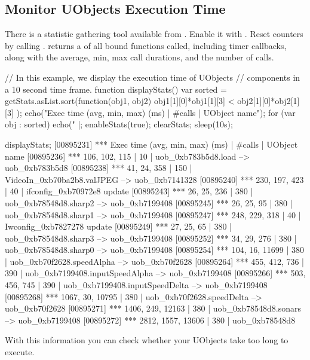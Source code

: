 \subsection{Monitor UObjects Execution Time}

There is a statistic gathering tool available from \us. Enable it with
. Reset counters by calling
.  returns a
 of all bound \Cxx functions called, including timer
callbacks, along with the average, min, max call durations, and the number
of calls.

\begin{urbiunchecked}
// In this example, we display the execution time of UObjects
// components in a 10 second time frame.
function displayStats()
{
  var sorted = getStats.asList.sort(function(obj1, obj2) {
    obj1[1][0]*obj1[1][3] < obj2[1][0]*obj2[1][3]
  });
  echo("Exec time (avg, min, max) (ms) | #calls | UObject name");
  for (var obj : sorted)
    echo("%
}|;
enableStats(true);
clearStats;
sleep(10s);

displayStats;
[00895231] *** Exec time (avg, min, max) (ms) | #calls | UObject name
[00895236] ***  106,  102,   115 |  10 | uob_0xb783b5d8.load --> uob_0xb783b5d8
[00895238] ***   41,   24,   358 | 150 | VideoIn_0xb70ba2b8.valJPEG --> uob_0xb7141328
[00895240] ***  230,  197,   423 |  40 | ifconfig_0xb70972e8 update
[00895243] ***   26,   25,   236 | 380 | uob_0xb78548d8.sharp2 --> uob_0xb7199408
[00895245] ***   26,   25,    95 | 380 | uob_0xb78548d8.sharp1 --> uob_0xb7199408
[00895247] ***  248,  229,   318 |  40 | Iwconfig_0xb7827278 update
[00895249] ***   27,   25,    65 | 380 | uob_0xb78548d8.sharp3 --> uob_0xb7199408
[00895252] ***   34,   29,   276 | 380 | uob_0xb78548d8.sharp0 --> uob_0xb7199408
[00895254] ***  104,   16, 11699 | 380 | uob_0xb70f2628.speedAlpha --> uob_0xb70f2628
[00895264] ***  455,  412,   736 | 390 | uob_0xb7199408.inputSpeedAlpha --> uob_0xb7199408
[00895266] ***  503,  456,   745 | 390 | uob_0xb7199408.inputSpeedDelta --> uob_0xb7199408
[00895268] *** 1067,   30, 10795 | 380 | uob_0xb70f2628.speedDelta --> uob_0xb70f2628
[00895271] *** 1406,  249, 12163 | 380 | uob_0xb78548d8.sonars --> uob_0xb7199408
[00895272] *** 2812, 1557, 13606 | 380 | uob_0xb78548d8
\end{urbiunchecked}

With this information you can check whether your UObjects take too long to
execute.


